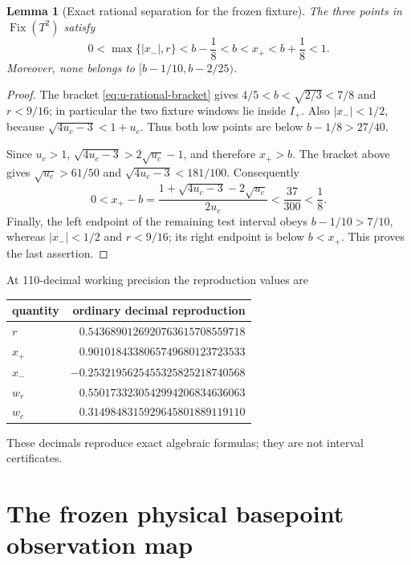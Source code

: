 \documentclass[11pt]{article}
\newtheorem{lemma}[theorem]{Lemma}
\theoremstyle{remark}
\newcommand{\Fix}{\operatorname{Fix}}
\begin{document}
\begin{lemma}[Exact rational separation for the frozen fixture]
\label{lem:fixture-separation}
The three points in $\Fix(T^2)$ satisfy
\begin{equation}\label{eq:fixture-separation}
 0<\max\{|x_-|,r\}<b-\frac18<b<x_+<b+\frac18<1.
\end{equation}
Moreover, none belongs to
$[b-1/10,b-2/25)$.
\end{lemma}

\begin{proof}
The bracket \eqref{eq:u-rational-bracket} gives
$4/5<b<\sqrt{2/3}<7/8$ and $r<9/16$; in particular the two fixture
windows lie inside $I_+$.
Also $|x_-|<1/2$, because
$\sqrt{4u_c-3}<1+u_c$.  Thus both low points are below
$b-1/8>27/40$.

Since $u_c>1$,
$\sqrt{4u_c-3}>2\sqrt{u_c}-1$, and therefore $x_+>b$.
The bracket above gives
$\sqrt{u_c}>61/50$ and
$\sqrt{4u_c-3}<181/100$.  Consequently
\[
 0<x_+-b
 =\frac{1+\sqrt{4u_c-3}-2\sqrt{u_c}}{2u_c}
 <\frac{37}{300}<\frac18.
\]
Finally, the left endpoint of the remaining test interval obeys
$b-1/10>7/10$, whereas $|x_-|<1/2$ and $r<9/16$; its right endpoint is
below $b<x_+$.  This proves the last assertion.
\end{proof}

At 110-decimal working precision the reproduction values are
\begin{center}\small
\begin{tabular}{lr}
\toprule
quantity & ordinary decimal reproduction\\
\midrule
$r$ & $0.5436890126920763615708559718$\\
$x_+$ & $0.9010184338065749680123723533$\\
$x_-$ & $-0.2532195625455325825218740568$\\
$w_r$ & $0.5501733230542994206834636063$\\
$w_c$ & $0.3149848315929645801889119110$\\
\bottomrule
\end{tabular}
\end{center}
These decimals reproduce exact algebraic formulas; they are not interval
certificates.

\section{The frozen physical basepoint observation map}
\end{document}
